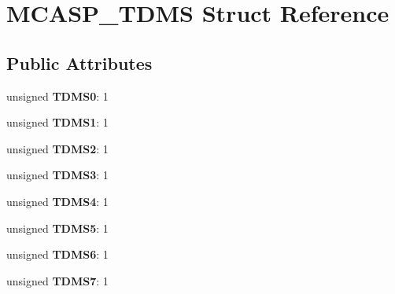 \hypertarget{structMCASP__TDMS}{\section{M\-C\-A\-S\-P\-\_\-\-T\-D\-M\-S Struct Reference}
\label{structMCASP__TDMS}
}
\subsection*{Public Attributes}
\begin{DoxyCompactItemize}
\item 
\hypertarget{structMCASP__TDMS_af9986a69e028282b0dd8d4ae1657402b}{unsigned {\bfseries T\-D\-M\-S0}\-: 1}\label{structMCASP__TDMS_af9986a69e028282b0dd8d4ae1657402b}

\item 
\hypertarget{structMCASP__TDMS_aaee8fb8362f47d9b85831849828a75fe}{unsigned {\bfseries T\-D\-M\-S1}\-: 1}\label{structMCASP__TDMS_aaee8fb8362f47d9b85831849828a75fe}

\item 
\hypertarget{structMCASP__TDMS_a9d508652bd90321bfc8bb1029aa94e08}{unsigned {\bfseries T\-D\-M\-S2}\-: 1}\label{structMCASP__TDMS_a9d508652bd90321bfc8bb1029aa94e08}

\item 
\hypertarget{structMCASP__TDMS_acf7127c01d8b28abb25fb5a94aec827e}{unsigned {\bfseries T\-D\-M\-S3}\-: 1}\label{structMCASP__TDMS_acf7127c01d8b28abb25fb5a94aec827e}

\item 
\hypertarget{structMCASP__TDMS_aae0e18cd1998a3f91ac6cc0f9b3aea02}{unsigned {\bfseries T\-D\-M\-S4}\-: 1}\label{structMCASP__TDMS_aae0e18cd1998a3f91ac6cc0f9b3aea02}

\item 
\hypertarget{structMCASP__TDMS_a3e4c156609b0112540a05c7b0555c896}{unsigned {\bfseries T\-D\-M\-S5}\-: 1}\label{structMCASP__TDMS_a3e4c156609b0112540a05c7b0555c896}

\item 
\hypertarget{structMCASP__TDMS_a4315be24a53ad507f2376ec7653f25cc}{unsigned {\bfseries T\-D\-M\-S6}\-: 1}\label{structMCASP__TDMS_a4315be24a53ad507f2376ec7653f25cc}

\item 
\hypertarget{structMCASP__TDMS_a2e36ee747b46ea72f93f50fb48288312}{unsigned {\bfseries T\-D\-M\-S7}\-: 1}\label{structMCASP__TDMS_a2e36ee747b46ea72f93f50fb48288312}


\end{DoxyCompactItemize}
